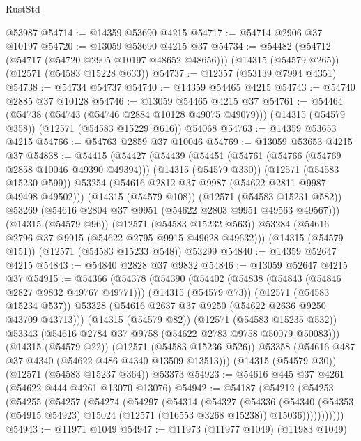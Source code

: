 \begin{lexlean}{RustStd}
\begin{coremodule}
    @53987
@54714 := @14359 @53690 @4215
@54717 := @54714 @2906 @37 @10197
@54720 := @13059 @53690 @4215 @37
@54734 := @54482
    (@54712 (@54717 (@54720 @2905 @10197 @48652 @48656)))
    (@14315 (@54579 @265))
    (@12571 (@54583 @15228 @633))
@54737 := @12357 (@53139 @7994 @4351)
@54738 := @54734 @54737
@54740 := @14359 @54465 @4215
@54743 := @54740 @2885 @37 @10128
@54746 := @13059 @54465 @4215 @37
@54761 := @54464
    (@54738 (@54743 (@54746 @2884 @10128 @49075 @49079)))
    (@14315 (@54579 @358))
    (@12571 (@54583 @15229 @616))
    @54068
@54763 := @14359 @53653 @4215
@54766 := @54763 @2859 @37 @10046
@54769 := @13059 @53653 @4215 @37
@54838 := @54415
    (@54427
      (@54439
        (@54451
          (@54761 (@54766 (@54769 @2858 @10046 @49390 @49394)))
          (@14315 (@54579 @330))
          (@12571 (@54583 @15230 @599))
          @53254
          (@54616 @2812 @37 @9987 (@54622 @2811 @9987 @49498 @49502)))
        (@14315 (@54579 @108))
        (@12571 (@54583 @15231 @582))
        @53269
        (@54616 @2804 @37 @9951 (@54622 @2803 @9951 @49563 @49567)))
      (@14315 (@54579 @96))
      (@12571 (@54583 @15232 @563))
      @53284
      (@54616 @2796 @37 @9915 (@54622 @2795 @9915 @49628 @49632)))
    (@14315 (@54579 @151))
    (@12571 (@54583 @15233 @548))
    @53299
@54840 := @14359 @52647 @4215
@54843 := @54840 @2828 @37 @9832
@54846 := @13059 @52647 @4215 @37
@54915 := @54366
    (@54378
      (@54390
        (@54402
          (@54838 (@54843 (@54846 @2827 @9832 @49767 @49771)))
          (@14315 (@54579 @73))
          (@12571 (@54583 @15234 @537))
          @53328
          (@54616 @2637 @37 @9250 (@54622 @2636 @9250 @43709 @43713)))
        (@14315 (@54579 @82))
        (@12571 (@54583 @15235 @532))
        @53343
        (@54616 @2784 @37 @9758 (@54622 @2783 @9758 @50079 @50083)))
      (@14315 (@54579 @22))
      (@12571 (@54583 @15236 @526))
      @53358
      (@54616 @487 @37 @4340 (@54622 @486 @4340 @13509 @13513)))
    (@14315 (@54579 @30))
    (@12571 (@54583 @15237 @364))
    @53373
@54923 := @54616 @445 @37 @4261 (@54622 @444 @4261 @13070 @13076)
@54942 := @54187
    (@54212
      (@54253
        (@54255
          (@54257
            (@54274
              (@54297
                (@54314
                  (@54327
                    (@54336
                      (@54340
                        (@54353
                          (@54915 @54923)
                          @15024
                          (@12571 (@16553 @3268 @15238))
                          @15036)))))))))))
@54943 := @11971 @1049
@54947 := @11973 (@11977 @1049) (@11983 @1049)

\end{coremodule}
\end{lexlean}
